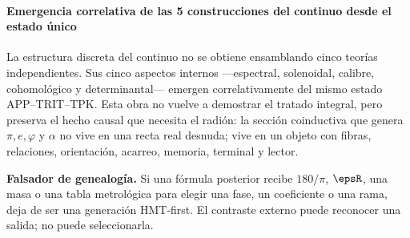 \paragraph{Emergencia correlativa de las 5 construcciones del continuo desde el estado único}

La estructura discreta del continuo no se obtiene ensamblando cinco teorías
independientes. Sus cinco aspectos internos ---espectral, solenoidal, calibre,
cohomológico y determinantal--- emergen correlativamente del mismo estado
APP--TRIT--TPK. Esta obra no vuelve a demostrar el tratado integral, pero
preserva el hecho causal que necesita el radión: la sección coinductiva que
genera \(\pi,e,\varphi\) y \(\alpha\) no vive en una recta real desnuda; vive
en un objeto con fibras, relaciones, orientación, acarreo, memoria, terminal y
lector.

\begin{statusbox}
\textbf{Falsador de genealogía.} Si una fórmula posterior recibe
\(180/\pi\), \(\epsR\), una masa o una tabla metrológica para elegir una fase,
un coeficiente o una rama, deja de ser una generación HMT-first. El contraste
externo puede reconocer una salida; no puede seleccionarla.
\end{statusbox}
